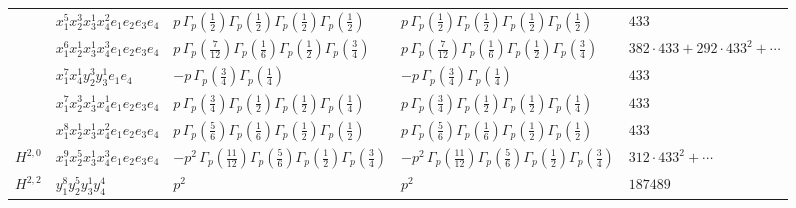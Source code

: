 \documentclass[11pt]{article}
\begin{document}
\begin{table}[ht]
{\begin{tabular}{@{}lllll@{}}
 & $x_{1}^{5} x_{2}^{3} x_{3}^{1} x_{4}^{2}  e_{1} e_{2} e_{3} e_{4}$ & $p \, \Gamma_p \left( \frac{1}{2} \right) \Gamma_p \left( \frac{1}{2} \right) \Gamma_p \left( \frac{1}{2} \right) \Gamma_p \left( \frac{1}{2} \right)$ & $p \, \Gamma_p \left( \frac{1}{2} \right) \Gamma_p \left( \frac{1}{2} \right) \Gamma_p \left( \frac{1}{2} \right) \Gamma_p \left( \frac{1}{2} \right)$ & $433$ \\
 & $x_{1}^{6} x_{2}^{1} x_{3}^{1} x_{4}^{3}  e_{1} e_{2} e_{3} e_{4}$ & $p \, \Gamma_p \left( \frac{7}{12} \right) \Gamma_p \left( \frac{1}{6} \right) \Gamma_p \left( \frac{1}{2} \right) \Gamma_p \left( \frac{3}{4} \right)$ & $p \, \Gamma_p \left( \frac{7}{12} \right) \Gamma_p \left( \frac{1}{6} \right) \Gamma_p \left( \frac{1}{2} \right) \Gamma_p \left( \frac{3}{4} \right)$ & $382{\cdot}433{+}292{\cdot}433^{2}{+}\cdots$ \\
 & $x_{1}^{7} x_{4}^{1} y_{2}^{3} y_{3}^{1} e_{1} e_{4}$ & $- p \, \Gamma_p \left( \frac{3}{4} \right) \Gamma_p \left( \frac{1}{4} \right)$ & $- p \, \Gamma_p \left( \frac{3}{4} \right) \Gamma_p \left( \frac{1}{4} \right)$ & $433$ \\
 & $x_{1}^{7} x_{2}^{3} x_{3}^{1} x_{4}^{1}  e_{1} e_{2} e_{3} e_{4}$ & $p \, \Gamma_p \left( \frac{3}{4} \right) \Gamma_p \left( \frac{1}{2} \right) \Gamma_p \left( \frac{1}{2} \right) \Gamma_p \left( \frac{1}{4} \right)$ & $p \, \Gamma_p \left( \frac{3}{4} \right) \Gamma_p \left( \frac{1}{2} \right) \Gamma_p \left( \frac{1}{2} \right) \Gamma_p \left( \frac{1}{4} \right)$ & $433$ \\
 & $x_{1}^{8} x_{2}^{1} x_{3}^{1} x_{4}^{2}  e_{1} e_{2} e_{3} e_{4}$ & $p \, \Gamma_p \left( \frac{5}{6} \right) \Gamma_p \left( \frac{1}{6} \right) \Gamma_p \left( \frac{1}{2} \right) \Gamma_p \left( \frac{1}{2} \right)$ & $p \, \Gamma_p \left( \frac{5}{6} \right) \Gamma_p \left( \frac{1}{6} \right) \Gamma_p \left( \frac{1}{2} \right) \Gamma_p \left( \frac{1}{2} \right)$ & $433$ \\
\midrule
$H^{2,0}$ & $x_{1}^{9} x_{2}^{5} x_{3}^{1} x_{4}^{3}  e_{1} e_{2} e_{3} e_{4}$ & $- p^{2} \, \Gamma_p \left( \frac{11}{12} \right) \Gamma_p \left( \frac{5}{6} \right) \Gamma_p \left( \frac{1}{2} \right) \Gamma_p \left( \frac{3}{4} \right)$ & $- p^{2} \, \Gamma_p \left( \frac{11}{12} \right) \Gamma_p \left( \frac{5}{6} \right) \Gamma_p \left( \frac{1}{2} \right) \Gamma_p \left( \frac{3}{4} \right)$ & $312{\cdot}433^{2}{+}\cdots$ \\
\midrule
$H^{2,2}$ & $y_{1}^{8} y_{2}^{5} y_{3}^{1} y_{4}^{4}$ & $p^{2} \,$ & $p^{2} \,$ & $187489$ \\
\bottomrule
\end{tabular}
}
\renewcommand{\arraystretch}{1.0}
\end{table}
\end{document}
